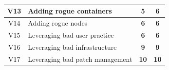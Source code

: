 \begin{table}[H]
{\begin{tabular}{|c|l|c|c|}
V13             & Adding rogue containers                                                                & \textbf{5}     & \textbf{6}     \\ \hline
V14             & Adding rogue nodes                                                                     & \textbf{6}     & \textbf{6}     \\ \hline
V15             & Leveraging bad user practice                                                           & \textbf{6}     & \textbf{6}     \\ \hline
V16             & Leveraging bad infrastructure                                                          & \textbf{9}     & \textbf{9}     \\ \hline
V17             & Leveraging bad patch management                                                        & \textbf{10}    & \textbf{10}    \\ \hline
\end{tabular}%
}
\label{tab:estimateComparison}
\end{table}

